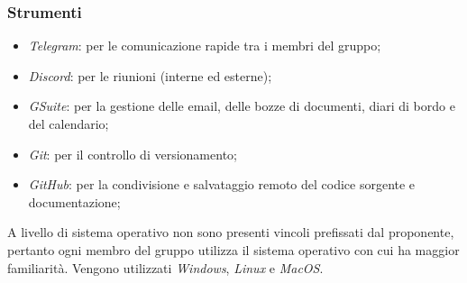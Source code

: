         \subsubsection{Strumenti}
            \begin{itemize}
                \item \textit{Telegram}: per le comunicazione rapide tra i membri del gruppo;
                \item \textit{Discord}: per le riunioni (interne ed esterne);
                \item \textit{GSuite}: per la gestione delle email, delle bozze di documenti, diari di bordo e del calendario;
                \item \textit{Git}: per il controllo di versionamento;
                \item \textit{GitHub}: per la condivisione e salvataggio remoto del codice sorgente e documentazione;
            \end{itemize}
            
            A livello di sistema operativo non sono presenti vincoli prefissati dal proponente, pertanto ogni membro del gruppo utilizza il sistema operativo con cui ha maggior familiarità.
            Vengono utilizzati \textit{Windows}, \textit{Linux} e \textit{MacOS}.

